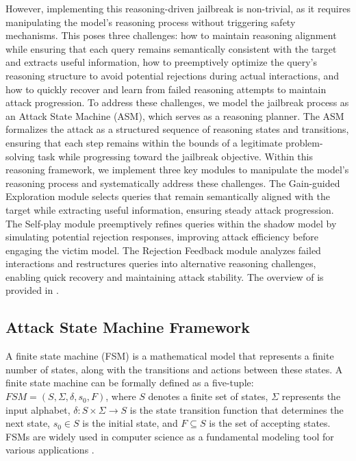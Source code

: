 However, implementing this reasoning-driven jailbreak is non-trivial, as it requires manipulating the model’s reasoning process without triggering safety mechanisms. This poses three challenges:  how to maintain reasoning alignment while ensuring that each query remains semantically consistent with the target and extracts useful information,  how to preemptively optimize the query’s reasoning structure to avoid potential rejections during actual interactions, and  how to quickly recover and learn from failed reasoning attempts to maintain attack progression. To address these challenges, we model the jailbreak process as an Attack State Machine (ASM), which serves as a reasoning planner. The ASM formalizes the attack as a structured sequence of reasoning states and transitions, ensuring that each step remains within the bounds of a legitimate problem-solving task while progressing toward the jailbreak objective. Within this reasoning framework, we implement three key modules to manipulate the model’s reasoning process and systematically address these challenges.  The Gain-guided Exploration module selects queries that remain semantically aligned with the target while extracting useful information, ensuring steady attack progression.  The Self-play module preemptively refines queries within the shadow model by simulating potential rejection responses, improving attack efficiency before engaging the victim model.  The Rejection Feedback module analyzes failed interactions and restructures queries into alternative reasoning challenges, enabling quick recovery and maintaining attack stability. The overview of \method{} is provided in .

\subsection{Attack State Machine Framework}

A finite state machine (FSM) \cite{fsmbase2,fsmbase1} is a mathematical model that represents a finite number of states, along with the transitions and actions between these states. A finite state machine can be formally defined as a five-tuple: $FSM = (S,\Sigma,\delta,s_{0},F)$, where $S$ denotes a finite set of states, $\Sigma$ represents the input alphabet, $\delta:S \times \Sigma \rightarrow S$ is the state transition function that determines the next state, $s_{0} \in S$ is the initial state, and $F \subseteq S$ is the set of accepting states. FSMs are widely used in computer science as a fundamental modeling tool for various applications \cite{fsm2,fsm3,fsm4,fsm5}. 

